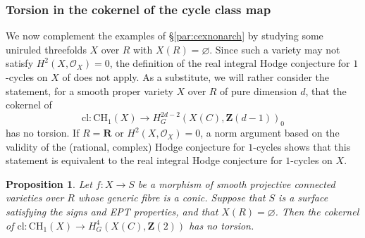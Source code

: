 \documentclass[JEP,XML,SOM,Unicode]{cedram}
\theoremstyle{plain}
\newtheorem{prop}[thm]{Proposition}
\theoremstyle{definition}
\numberwithin{equation}{section}
\newcommand{\cl}{{\mathrm{cl}}}
\newcommand{\sO}{{\mathscr O}}
\newcommand{\R}{{\mathbf R}}
\newcommand{\Z}{{\mathbf Z}}
\newcommand{\CH}{\mathrm{CH}}
\renewcommand{\emptyset}{\varnothing}
\begin{document}
\subsubsection{Torsion in the cokernel of the cycle class map}
\label{subsubsec:cokcycleclassmap}
We now complement the examples of \S \ref{par:cexnonarch} by studying some uniruled threefolds $X$ over $R$ with $X(R)=\emptyset$.
Since such a variety may not satisfy $H^2(X,\sO_X)=0$, the definition of the real integral Hodge conjecture for $1$-cycles on $X$ of \cite[Def.\,\ref*{BW1-def:ihc real closed field}]{BW1} does not apply. As a substitute, we will rather consider the statement, for a smooth proper
variety $X$ over $R$ of pure dimension $d$, that the cokernel of
\[
\cl:\CH_1(X)\to H^{2d-2}_G(X(C),\Z(d-1))_0
\]
has no torsion. If $R=\R$
or $H^2(X,\sO_X)=0$,
a norm argument based on the validity of the (rational, complex) Hodge conjecture for $1$\nobreakdash-cycles
shows that this statement is equivalent to the real integral Hodge conjecture for $1$-cycles on $X$.

\begin{prop}
\label{prop:cokersstorsion}
Let $f:X\to S$ be a morphism of smooth projective connected varieties over $R$ whose generic fibre is a conic. Suppose that $S$ is a surface satisfying the signs and EPT properties, and that $X(R)=\emptyset$. Then the cokernel of $\cl:\CH_1(X)\to H^{4}_G(X(C),\Z(2))$ has no torsion.
\end{prop}
\end{document}
